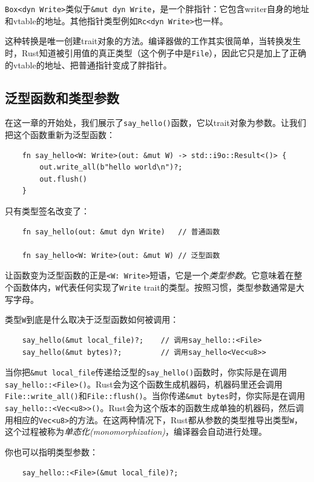 \texttt{Box<dyn Write>}类似于\texttt{\&mut dyn Write}，是一个胖指针：它包含writer自身的地址和vtable的地址。其他指针类型例如\texttt{Rc<dyn Write>}也一样。

这种转换是唯一创建trait对象的方法。编译器做的工作其实很简单，当转换发生时，Rust知道被引用值的真正类型（这个例子中是\texttt{File}），因此它只是加上了正确的vtable的地址、把普通指针变成了胖指针。

\subsection{泛型函数和类型参数}
在这一章的开始处，我们展示了\texttt{say\_hello()}函数，它以trait对象为参数。让我们把这个函数重新为泛型函数：
\begin{verbatim}
    fn say_hello<W: Write>(out: &mut W) -> std::i9o::Result<()> {
        out.write_all(b"hello world\n")?;
        out.flush()
    }
\end{verbatim}

只有类型签名改变了：
\begin{verbatim}
    fn say_hello(out: &mut dyn Write)   // 普通函数

    fn say_hello<W: Write>(out: &mut W) // 泛型函数
\end{verbatim}

让函数变为泛型函数的正是\texttt{<W: Write>}短语，它是一个\emph{类型参数}。它意味着在整个函数体内，\texttt{W}代表任何实现了\texttt{Write} trait的类型。按照习惯，类型参数通常是大写字母。

类型\texttt{W}到底是什么取决于泛型函数如何被调用：
\begin{verbatim}
    say_hello(&mut local_file)?;    // 调用say_hello::<File>
    say_hello(&mut bytes)?;         // 调用say_hello<Vec<u8>>
\end{verbatim}

当你把\texttt{\&mut local\_file}传递给泛型的\texttt{say\_hello()}函数时，你实际是在调用\texttt{say\_hello::<File>()}。Rust会为这个函数生成机器码，机器码里还会调用\texttt{File::write\_all()}和\texttt{File::flush()}。当你传递\texttt{\&mut bytes}时，你实际是在调用\texttt{say\_hello::<Vec<u8>>()}。Rust会为这个版本的函数生成单独的机器码，然后调用相应的\texttt{Vec<u8>}的方法。在这两种情况下，Rust都从参数的类型推导出类型\texttt{W}，这个过程被称为\emph{单态化(monomorphization)}，编译器会自动进行处理。

你也可以指明类型参数：
\begin{verbatim}
    say_hello::<File>(&mut local_file)?;
\end{verbatim}


